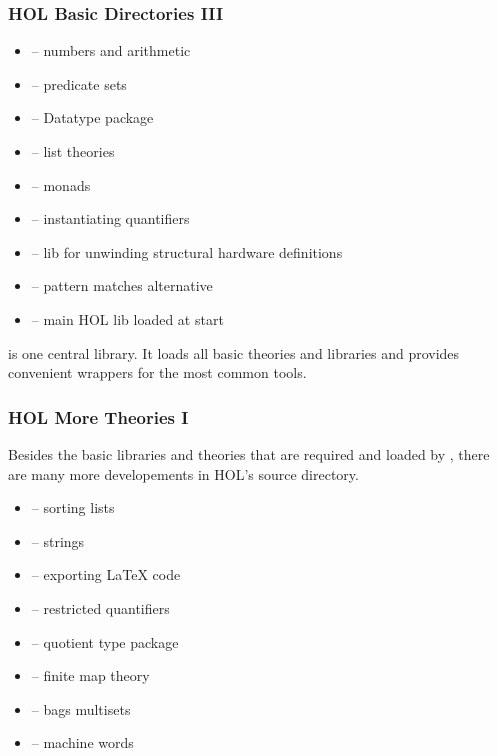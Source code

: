 \begin{frame}
\frametitle{HOL Basic Directories III}

\begin{itemize}
\item {} -- numbers and arithmetic
\item {} -- predicate sets
\item {} -- Datatype package
\item {} -- list theories
\item {} -- monads
\item {} -- instantiating quantifiers
\item {} -- lib for unwinding structural hardware definitions
\item {} -- pattern matches alternative
\item {} -- main HOL lib loaded at start
\end{itemize}
\bigskip

 is one central library. It loads all basic theories and libraries and
provides convenient wrappers for the most common tools.
\end{frame}


\begin{frame}
\frametitle{HOL More Theories I}

Besides the basic libraries and theories that are required and loaded by , there
are many more developements in HOL's source directory.

\begin{itemize}
\item {} -- sorting lists
\item {} -- strings
\item {} -- exporting LaTeX code
\item {} -- restricted quantifiers
\item {} -- quotient type package
\item {} -- finite map theory
\item {} -- bags \aka multisets
\item {} -- machine words
\end{itemize}
\end{frame}


